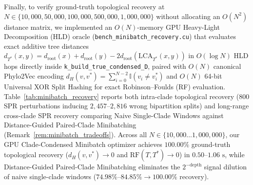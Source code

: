 \documentclass[11pt,a4paper]{article}
\theoremstyle{definition}
\begin{document}
Finally, to verify ground-truth topological recovery at $N \in \{10{,}000, 50{,}000, 100{,}000, 500{,}000, 1{,}000{,}000\}$ without allocating an $O(N^2)$ distance matrix, we implemented an $O(N)$-memory GPU Heavy-Light Decomposition (HLD) oracle (\texttt{bench\_minibatch\_recovery.cu}) that evaluates exact additive tree distances $d_{T^*}(x,y) = d_{\text{root}}(x) + d_{\text{root}}(y) - 2 d_{\text{root}}(\text{LCA}_{T^*}(x,y))$ in $O(\log N)$ HLD hops directly inside \texttt{k\_build\_true\_condensed\_D}, paired with $O(N)$ canonical Phylo2Vec encoding $d_H(v, v^*) = \sum_{i=0}^{N-2} \mathbb{I}(v_i \neq v_i^*)$ and $O(N)$ 64-bit Universal XOR Split Hashing for exact Robinson--Foulds (RF) evaluation. Table~\ref{tab:minibatch_recovery} reports both intra-clade topological recovery ($800$ SPR perturbations inducing $2{,}457\text{--}2{,}816$ wrong bipartition splits) and long-range cross-clade SPR recovery comparing Naive Single-Clade Windows against Distance-Guided Paired-Clade Minibatching (Remark~\ref{rem:minibatch_tradeoffs}). Across all $N \in \{10{,}000 \dots 1{,}000{,}000\}$, our GPU Clade-Condensed Minibatch optimizer achieves $\mathbf{100.00\%}$ ground-truth topological recovery ($d_H(v, v^*) \to 0$ and $\text{RF}(T, T^*) \to 0$) in $0.50\text{--}1.06\text{ s}$, while Distance-Guided Paired-Clade Minibatching eliminates the $2^{-\text{depth}}$ signal dilution of naive single-clade windows ($74.98\%\text{--}84.85\% \to \mathbf{100.00\%}$ recovery).
\end{document}
